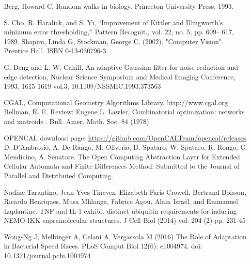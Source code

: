 \documentclass[conference]{IEEEtran}
\begin{document}
%
%
%
\begin{thebibliography}{1}

Berg, Howard C. Random walks in biology. Princeton University Press, 1993.

S. Cho, R. Haralick, and S. Yi, ``Improvement of Kittler and Illingworth’s minimum error thresholding,'' Pattern Recognit., vol. 22, no. 5, pp. 609– 617, 1989.
Shapiro, Linda G, Stockman, George C. (2002). "Computer Vision". Prentice Hall. ISBN 0-13-030796-3

G. Deng and L. W. Cahill, An adaptive Gaussian filter for noise reduction and edge detection, Nuclear Science Symposium and Medical Imaging Conference, 1993. 1615-1619 vol.3, 10.1109/NSSMIC.1993.373563

CGAL, Computational Geometry Algorithms Library, http://www.cgal.org
Bellman, R. E. Review: Eugene L. Lawler, Combinatorial optimization: networks and matroids . 
 Bull. Amer. Math. Soc. 84 (1978)



OPENCAL download page: \url{https://github.com/OpenCALTeam/opencal/releases}
D. D'Ambrosio, A. De Rango, M. Oliverio, D. Spataro, W. Spataro, R. Rongo, G. Mendicino, A. Senatore. The Open Computing Abstraction Layer for Extended Cellular Automata and Finite Differences Method. Submitted to the Journal of Parallel and Distributed Computing.

Nadine Tarantino, Jean-Yves Tinevez, Elizabeth Faris Crowell, Bertrand Boisson, Ricardo Henriques, Musa Mhlanga, Fabrice Agou, Alain Israël, and Emmanuel Laplantine. TNF and IL-1 exhibit distinct ubiquitin requirements for inducing NEMO-IKK supramolecular structures. J Cell Biol (2014) vol. 204 (2) pp. 231-45


Wong-Ng J, Melbinger A, Celani A, Vergassola M (2016) The Role of Adaptation in Bacterial Speed Races. PLoS Comput Biol 12(6): e1004974. doi: 10.1371/journal.pcbi.1004974


\end{thebibliography}
\end{document}
